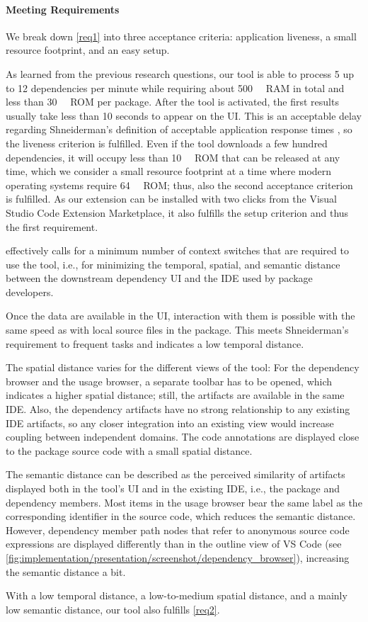 \paragraph{Meeting Requirements}

We break down \cref{req1} into three acceptance criteria: application liveness, a small resource footprint, and an easy setup.

As learned from the previous research questions, our tool is able to process 5 up to 12 dependencies per minute while requiring about \SI{500}{\mega\byte} RAM in total and less than \SI{30}{\mega\byte} ROM per package.
After the tool is activated, the first results usually take less than 10 seconds to appear on the UI.
This is an acceptable delay regarding Shneiderman's definition of acceptable application response times \citep{shneiderman2010designing}, so the liveness criterion is fulfilled.
Even if the tool downloads a few hundred dependencies, it will occupy less than \SI{10}{\giga\byte} ROM that can be released at any time, which we consider a small resource footprint at a time where modern operating systems require \SI{64}{\giga\byte} ROM; thus, also the second acceptance criterion is fulfilled.
As our extension can be installed with two clicks from the Visual Studio Code Extension Marketplace, it also fulfills the setup criterion and thus the first requirement.

 effectively calls for a minimum number of context switches that are required to use the tool, i.e., for minimizing the temporal, spatial, and semantic distance \citep{ungar1997debugging} between the downstream dependency UI and the IDE used by package developers.

Once the data are available in the UI, interaction with them is possible with the same speed as with local source files in the package.
This meets Shneiderman's requirement to frequent tasks and indicates a low temporal distance.

The spatial distance varies for the different views of the tool:
For the dependency browser and the usage browser, a separate toolbar has to be opened, which indicates a higher spatial distance; still, the artifacts are available in the same IDE.
Also, the dependency artifacts have no strong relationship to any existing IDE artifacts, so any closer integration into an existing view would increase coupling between independent domains.
The code annotations are displayed close to the package source code with a small spatial distance.

The semantic distance can be described as the perceived similarity of artifacts displayed both in the tool's UI and in the existing IDE, i.e., the package and dependency members.
Most items in the usage browser bear the same label as the corresponding identifier in the source code, which reduces the semantic distance.
However, dependency member path nodes that refer to anonymous source code expressions are displayed differently than in the outline view of VS Code (see \cref{fig:implementation/presentation/screenshot/dependency_browser}), increasing the semantic distance a bit.

With a low temporal distance, a low-to-medium spatial distance, and a mainly low semantic distance, our tool also fulfills \cref{req2}.
